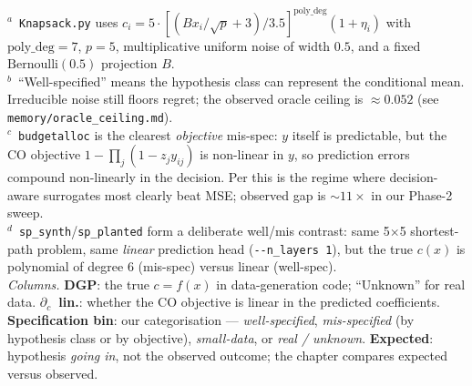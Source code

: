 \begin{table}
    \vspace{0.5em}
    \begin{flushleft}
    \scriptsize
    $^{a}$~\texttt{Knapsack.py} uses $c_i = 5\cdot[(B x_i/\sqrt{p}+3)/3.5]^{\mathrm{poly\_deg}}(1+\eta_i)$ with
    $\mathrm{poly\_deg}=7$, $p=5$, multiplicative uniform noise of width $0.5$, and a fixed
    $\mathrm{Bernoulli}(0.5)$ projection $B$.\\[2pt]
    $^{b}$~``Well-specified'' means the hypothesis class can represent the conditional mean.
    Irreducible noise still floors regret; the observed oracle ceiling is $\approx 0.052$
    (see \texttt{memory/oracle\_ceiling.md}).\\[2pt]
    $^{c}$~\texttt{budgetalloc} is the clearest \emph{objective} mis-spec: $y$ itself is predictable,
    but the CO objective $1 - \prod_j (1 - z_j y_{ij})$ is non-linear in $y$, so prediction errors
    compound non-linearly in the decision. Per \citet{elmachtoub2025misspec} this is the regime where
    decision-aware surrogates most clearly beat MSE; observed gap is $\sim 11\times$ in our Phase-2 sweep.\\[2pt]
    $^{d}$~\texttt{sp\_synth}/\texttt{sp\_planted} form a deliberate well/mis contrast: same 5$\times$5
    shortest-path problem, same \emph{linear} prediction head (\texttt{-{}-n\_layers 1}), but the true
    $c(x)$ is polynomial of degree 6 (mis-spec) versus linear (well-spec).\\[2pt]
    \textit{Columns.} \textbf{DGP}: the true $c=f(x)$ in data-generation code; ``Unknown'' for real data.
    \textbf{$\partial_c$~lin.}: whether the CO objective is linear in the predicted coefficients.
    \textbf{Specification bin}: our categorisation — \emph{well-specified}, \emph{mis-specified}
    (by hypothesis class or by objective), \emph{small-data}, or \emph{real / unknown}.
    \textbf{Expected}: hypothesis \emph{going in}, not the observed outcome; the chapter compares expected
    versus observed.
    \end{flushleft}
\end{table}
